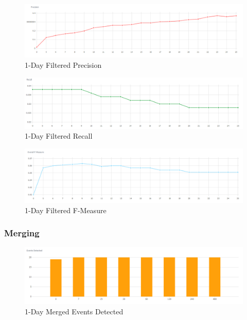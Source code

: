 \documentclass[a4paper,portrait,12pt]{article}
\begin{document}
\begin{figure}[H]
	\centering
	\includegraphics[width=\linewidth]{images/1day-filtered-precision.png}
	\caption{1-Day Filtered Precision}
	\label{fig:1day-filtered-precision}
\end{figure}

\begin{figure}[]
	\centering
	\includegraphics[width=\linewidth]{images/1day-filtered-recall.png}
	\caption{1-Day Filtered Recall}
	\label{fig:1day-filtered-recall}
\end{figure}

\begin{figure}[H]
	\centering
	\includegraphics[width=\linewidth]{images/1day-filtered-f-measure.png}
	\caption{1-Day Filtered F-Measure}
	\label{fig:1day-filtered-f-measure}
\end{figure}

\subsubsection{Merging}

\begin{figure}[H]
	\centering
	\includegraphics[width=\linewidth]{images/1day-merged-events-detected.png}
	\caption{1-Day Merged Events Detected}
	\label{fig:1day-merged-events-detected}
\end{figure}
\end{document}
